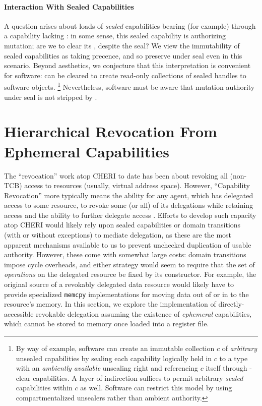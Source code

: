 \paragraph{Interaction With Sealed Capabilities}
%
A question arises about loads of \emph{sealed} capabilities bearing (for
example) \cappermS through a capability lacking \cappermRML: in some sense,
this sealed capability is authorizing mutation; are we to clear its \cappermS,
despite the seal?  We view the immutability of sealed capabilities as taking
precence, and so preserve \cappermS under seal even in this scenario.  Beyond
aesthetics, we conjecture that this interpretation is convenient for software:
\cappermRML can be cleared to create read-only collections of sealed handles to
software objects.%
%
\footnote{By way of example, software can create an immutable collection $c$ of
\emph{arbitrary} unsealed capabilities by sealing each capability logically
held in $c$ to a type with an \emph{ambiently available} unsealing right and
referencing $c$ itself through \cappermRML-clear capabilities.  A layer of
indirection suffices to permit arbitrary \emph{sealed} capabilities within $c$
as well.  Software can restrict this model by using compartmentalized unsealers
rather than ambient authority.}
%
Nevertheless, software must be aware that mutation authority under seal is not
stripped by \cappermRML.

\let\cappermRML\undefined

\section{Hierarchical Revocation From Ephemeral Capabilities} %
\label{app:exp:hierarchal-evocation}

The ``revocation'' work atop CHERI to date has been about revoking all
(non-TCB) access to resources (usually, virtual address space).  However,
``Capability Revocation'' more typically means the ability for any agent,
which has delegated access to some resource, to revoke some (or all) of its
delegations while retaining access and the ability to further delegate
access \cite{Redell74}.
%
Efforts to develop such capacity atop CHERI would likely rely upon sealed
capabilities or domain transitions (with or without exceptions) to mediate
delegation, as these are the most apparent mechanisms available to us to
prevent unchecked duplication of usable authority.  However, these come with
somewhat large costs: domain transitions impose cycle overheads, and either
strategy would seem to require that the set of \emph{operations} on the
delegated resource be fixed by its constructor.  For example, the original
source of a revokably delegated data resource would likely have to provide
specialized \texttt{memcpy} implementations for moving data out of or in to
the resource's memory.
In this section, we explore the implementation of directly-accessible
revokable delegation assuming the existence of \emph{ephemeral}
capabilities, which cannot be stored to memory once loaded into a register
file.

